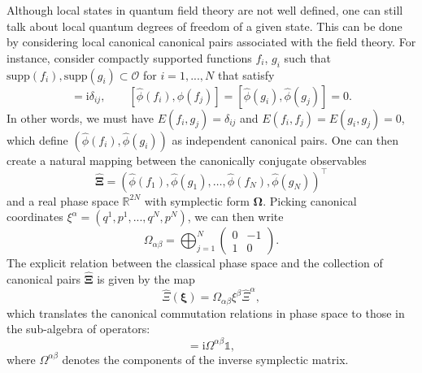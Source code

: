 \documentclass[letterpaper,12pt,titlepage,oneside,final]{book}
\newcommand{\openone}{\mathds{1}}
\newcommand{\ii}{\mathrm{i}}
\begin{document}
Although local states in quantum field theory are not well defined, one can still talk about local quantum degrees of freedom of a given state. This can be done by considering local canonical canonical pairs associated with the field theory. For instance, consider compactly supported functions $f_i$, $g_i$ such that $\text{supp}(f_i),\text{supp}(g_i)\subset\mathcal{O}$ for $i=1,...,N$ that satisfy
\begin{equation}
    [\hat{\phi}(f_i), \hat{\phi}(g_j)] = \ii \delta_{ij}, \quad\quad [\hat{\phi}(f_i),\hat{\phi}(f_j)] = [\hat{\phi}(g_i),\hat{\phi}(g_j)] = 0.
\end{equation}
In other words, we must have $E(f_i,g_j) = \delta_{ij}$ and $E(f_i,f_j) = E(g_i,g_j) = 0$, which define $(\hat{\phi}(f_i),\hat{\phi}(g_i))$ as independent canonical pairs. One can then create a natural mapping between the canonically conjugate observables 
\begin{equation}
    \bm{\hat\Xi} = (\hat{\phi}(f_1),\hat{\phi}(g_1),\hdots,\hat{\phi}(f_N),\hat{\phi}(g_N))^\intercal
\end{equation}
and a real phase space $\mathbb{R}^{2N}$ with symplectic form $\bm\Omega$. Picking canonical coordinates $\xi^\alpha = (q^1,p^1,...,q^N,p^N)$, we can then write
\begin{equation}\label{eq:OmegaSymplecticMatrix}
\Omega_{\alpha\beta} = \bigoplus_{j=1}^N \begin{pmatrix}
0 & -1 \\
1 & 0
\end{pmatrix}.
\end{equation}
The explicit relation between the classical phase space and the collection of canonical pairs $\hat{\bm \Xi}$ is given by the map
\begin{equation}
\hat\Xi(\bm \xi) = \Omega_{\alpha\beta}\xi^\beta\hat\Xi^\alpha,
\end{equation}
which translates the canonical commutation relations in phase space to those in the sub-algebra of operators:
\begin{equation}
    [\hat{\Xi}^\alpha,\hat{\Xi}^\beta] = \ii \Omega^{\alpha\beta} \openone,
\end{equation}
where $\Omega^{\alpha\beta}$ denotes the components of the inverse symplectic matrix. 
\end{document}

